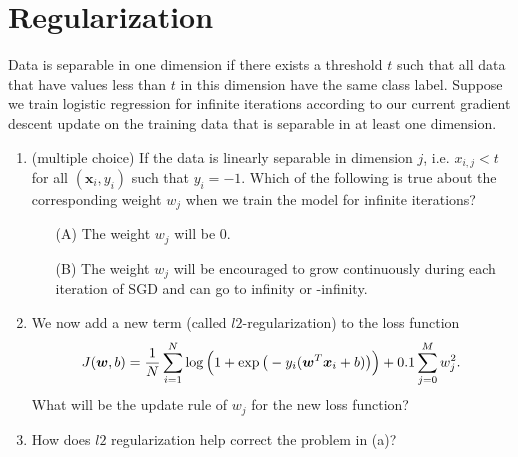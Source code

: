 \section{Regularization }
Data is separable in one dimension if there exists a threshold $t$ such that all data that have values less than $t$ in this dimension have the same class label. Suppose we train logistic regression for infinite iterations according to our current gradient descent update on the training data that is separable in at least one dimension.
\begin{enumerate}
\item {} (multiple choice) If the data is linearly separable in dimension $j$, i.e. $x_{i,j}<t$ for all $(\mathbf{x}_i,y_i)$ such that $y_i=-1$. Which of the following is true about the corresponding weight $w_j$ when we train the model for infinite iterations?

\begin{itemize}
\item[(A)] The weight $w_j$ will be 0.
\item[(B)] The weight $w_j$ will be encouraged to grow continuously during each iteration of SGD
and can go to infinity or -infinity.
\end{itemize}





\item {} We now add a new term (called $l2$-regularization) to the loss function
\begin{equation}
\label{eq:j}
J(\boldsymbol{w}, b) = 
  \frac{1}{N} \sum_{i=1}^{N}\log\Big(1+\exp\big(-y_i(\boldsymbol{w}^T \boldsymbol{x}_i+b)\big)\Big) +  0.1 \sum^M_{j=0}w_j^2.
\end{equation}
What will be the update rule of $w_j$ for the new loss function?



\item {} How does $l2$ regularization help correct the problem in (a)?


\end{enumerate}